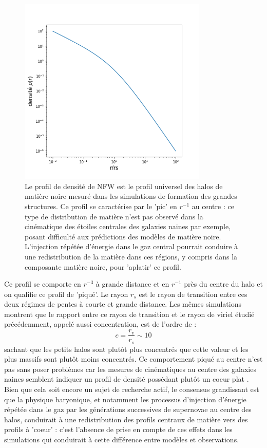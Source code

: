 \begin{figure}[htbp]
	\centering
		\includegraphics[height=9cm]{figs/nfw.png}
		\caption[Le profil de densité NFW]{Le profil de densité de NFW est le profil universel des halos de matière noire mesuré dans les simulations de formation des grandes structures. Ce profil se caractérise par le 'pic' en $r^{-1}$ au centre : ce type de distribution de matière n'est pas observé dans la cinématique des étoiles centrales des galaxies naines par exemple, posant difficulté aux prédictions des modèles de matière noire. L'injection répétée d'énergie dans le gaz central pourrait conduire à une redistribution de la matière dans ces régions, y compris dans la composante matière noire, pour 'aplatir' ce profil.}
	\label{f:nfw}
\end{figure}

Ce profil se comporte en $r^{-3}$ à grande distance et en $r^{-1}$ près du centre du halo et on qualifie ce profil de 'piqué'. Le rayon $r_s$ est le rayon de transition entre ces deux régimes de pentes à courte et grande distance. Les mêmes simulations montrent que le rapport entre ce rayon de transition et le rayon de viriel étudié précédemment, appelé aussi concentration, est de l'ordre de :
\begin{equation}
c=\frac{r_v}{r_s}\sim 10
\end{equation}
sachant que les petits halos sont plutôt plus concentrés que cette valeur et les plus massifs sont plutôt moins concentrés. Ce comportement piqué au centre n'est pas sans poser problèmes car les mesures de cinématiques au centre des galaxies naines semblent indiquer un profil de densité possédant plutôt un coeur plat . Bien que cela soit encore un sujet de recherche actif, le consensus grandissant est que la physique baryonique, et notamment les processus d'injection d'énergie répétée dans le gaz par les générations successives de supernovae au centre des halos, conduirait à une redistribution des profils centraux de matière vers des profils à 'coeur' : c'est l'absence de prise en compte de ces effets dans les simulations qui conduirait à cette différence entre modèles et observations.

